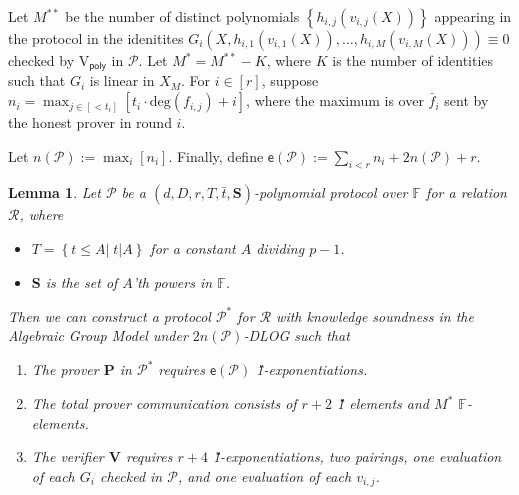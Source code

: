 \documentclass[11pt]{article} %
\newcommand{\F}{\ensuremath{\mathbb F}\xspace}
\newcommand{\proverexp}{\ensuremath{\mathsf{e}}\xspace}
\renewcommand{\deg}{\ensuremath{\mathrm{deg}}\xspace}
\newcommand{\polprot}[6]{$(#1,#2,#3,#4,#5,#6)$-polynomial protocol}
\newcommand{\defeq}{:=}
\newcommand{\prv}{\ensuremath{\mathsf{\mathbf{P}}}\xspace}
\newcommand{\verpoly}{\ensuremath{\mathrm{V_{\mathsf{poly}}}}\xspace}
\newcommand{\ver}{\ensuremath{\mathsf{\mathbf{V}}}\xspace}
\newcommand{\rel}{\ensuremath{\mathcal{R}}\xspace}
\newcommand{\set}[1]{\ensuremath{\left\{#1\right\}}\xspace}
\newcommand{\prot}{\ensuremath{\mathscr{P}}\xspace}
\newcommand{\protprime}{\ensuremath{\mathscr{P^*}}\xspace}
\newtheorem{lemma}{Lemma}[section]
\newcommand{\openset}{\ensuremath{\mathbf{S}}\xspace}
\newcommand{\lt}[1]{\ensuremath{ [ {\scriptscriptstyle <} #1]}\xspace}
\newcommand{\f}{\ensuremath{\bar{f}}\xspace}
\renewcommand{\t}{\ensuremath{\bar{t}}\xspace}
\newcommand{\sumi}[1]{\sum_{i<#1}}
\begin{document}
Let $M^{**}$ be the number of distinct polynomials $\set{h_{i,j}(v_{i,j}(X))}$ appearing in the protocol in the idenitites 
$G_i(X, h_{i,1}(v_{i,1}(X)),\ldots,h_{i,M}(v_{i,M}(X)))\equiv 0$
checked by \verpoly in \prot.
Let $M^*= M^{**}-K$,
where $K$ is the number of identities such that $G_i$ is linear in $X_M$.
For $i\in [r]$, suppose $n_i=\max_{j\in\lt{t_i}} \left[t_i\cdot \deg(f_{i,j})+i\right] $, where the maximum is over $\f_i$ sent by the honest prover in round $i$. 

Let $n(\prot)\defeq \max_{i} \left[n_i\right]$.
Finally, define $\proverexp(\prot) \defeq \sumi{r}n_i + 2n(\prot)+r$.

 \begin{lemma}\label{lem:ideal-to-AGM}
 Let \prot be a \polprot{d}{D}{r}{T}{\t}{\openset} over \F for a relation \rel, where 
 \begin{itemize}
  \item 
$T=\set{t\leq A|\; t|A}$ for a constant $A$ dividing $p-1$. 
\item \openset is the set of $A$'th powers in \F.
 \end{itemize}
 Then we can construct a protocol \protprime for \rel with knowledge soundness in the Algebraic Group Model under $2n(\prot)$-DLOG such that
 \begin{enumerate}
  \item The prover \prv in \protprime requires $\proverexp(\prot)$ \G1-exponentiations.
  \item The total prover communication consists of $r+2$ \G1 elements and $M^*$ \F-elements. 
\item The verifier \ver requires $r+4$ \G1-exponentiations, two pairings, one evaluation of each $G_i$ checked in \prot, and one evaluation of each $v_{i,j}$.
  \end{enumerate}

\end{lemma}
\end{document}
